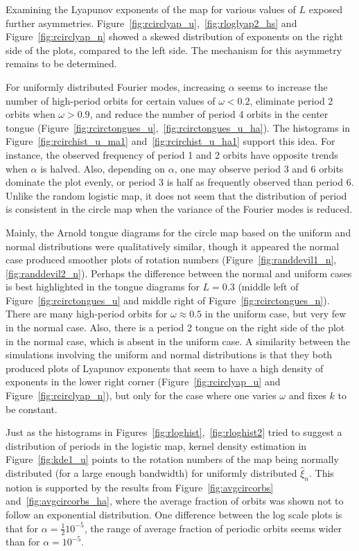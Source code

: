 Examining the Lyapunov exponents of the map
for various values of $L$ exposed further asymmetries. Figure~\ref{fig:rcirclyap_u},~\ref{fig:rloglyap2_hs}
and Figure~\ref{fig:rcirclyap_n} showed a skewed distribution of
exponents on the right side of the plots, compared to the left
side. The mechanism for this asymmetry remains to be determined.

For uniformly distributed Fourier modes, increasing $\alpha$ seems to increase the number of
high-period orbits for certain values of $\omega < 0.2$, eliminate period
2 orbits when $\omega >0.9$, and reduce the number of period 4 orbits
in the center tongue
(Figure~\ref{fig:rcirctongues_u},~\ref{fig:rcirctongues_u_ha}). The
histograms in Figure~\ref{fig:rcirchist_u_ma1} and~\ref{fig:rcirchist_u_ha1} support this idea. For
instance, the observed frequency of
period 1 and 2 orbits have opposite trends when $\alpha$ is
halved. Also, depending on $\alpha$, one may observe period 3 and 6 orbits dominate the plot evenly, or period 3 is half as frequently observed than
period 6. Unlike the random logistic map, it does not seem that the
distribution of period is consistent in the circle map when the
variance of the Fourier modes is reduced.  

Mainly, the Arnold tongue diagrams for the circle map based on the uniform and
normal distributions were qualitatively similar, though it appeared the normal
case produced smoother plots of rotation numbers
(Figure~\ref{fig:randdevil1_n}, \ref{fig:randdevil2_n}). Perhaps the
difference between the normal and uniform cases is best highlighted in
the tongue diagrams for $L = 0.3$ (middle left of
Figure~\ref{fig:rcirctongues_u} and middle right of
Figure~\ref{fig:rcirctongues_n}). There are many high-period orbits
for $\omega\approx 0.5$ in the uniform case, but very
few in the normal case. Also, there is a period 2 tongue on the right
side of the plot in the normal case, which is absent in the uniform
case. A similarity between the simulations involving the uniform and normal
distributions is that they both produced plots of Lyapunov exponents that seem to have a
high density of exponents in the lower right corner
(Figure~\ref{fig:rcirclyap_u} and Figure~\ref{fig:rcirclyap_n}), but
only for the case where one varies $\omega$ and fixes $k$ to be
constant.

Just as the histograms in Figures~\ref{fig:rloghist},~\ref{fig:rloghist2} tried to suggest a
distribution of periods in the logistic map, kernel density estimation
in Figure~\ref{fig:kde1_u} points to the rotation numbers of the map
being normally distributed (for a large enough bandwidth) for
uniformly distributed $\hat{\xi}_n$. This notion is supported by the
results from Figure~\ref{fig:avgcircorbs} and~\ref{fig:avgcircorbs_ha}, where the average fraction of orbits was shown not to follow an exponential
distribution. One difference between the log scale plots is that for $\alpha=\frac{1}{2}10^{-5}$, the range
of average fraction of periodic orbits seems wider than for
$\alpha=10^{-5}$. 

